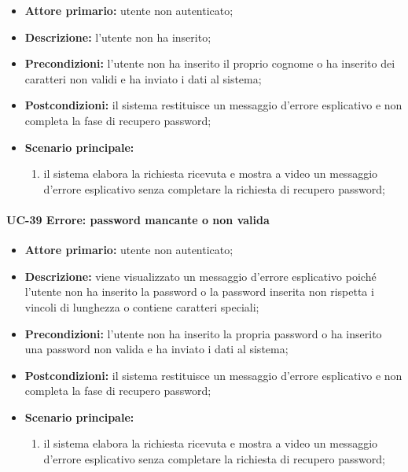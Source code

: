 	\begin{itemize}
		\item \textbf{Attore primario:} utente non autenticato;

		\item \textbf{Descrizione:} l'utente non ha inserito;

		\item \textbf{Precondizioni:} l'utente non ha inserito il proprio cognome o ha inserito dei caratteri non validi e ha inviato i dati al sistema;

		\item \textbf{Postcondizioni:} il sistema restituisce un messaggio d'errore esplicativo e non completa la fase di recupero password;

		\item \textbf{Scenario principale:}
	  		\begin{enumerate}
		  		\item il sistema elabora la richiesta ricevuta e mostra a video un messaggio d'errore esplicativo senza completare la richiesta di recupero password; 
	  		\end{enumerate}
	\end{itemize}

\paragraph{UC-39 Errore: password mancante o non valida}

	\begin{itemize}
		\item \textbf{Attore primario:} utente non autenticato;

		\item \textbf{Descrizione:} viene visualizzato un messaggio d'errore esplicativo poiché l'utente non ha inserito la password o la password inserita non rispetta i vincoli di lunghezza o contiene caratteri speciali;

		\item \textbf{Precondizioni:} l'utente non ha inserito la propria password o ha inserito una password non valida e ha inviato i dati al sistema;

		\item \textbf{Postcondizioni:} il sistema restituisce un messaggio d'errore esplicativo e non completa la fase di recupero password;

		\item \textbf{Scenario principale:}
	  		\begin{enumerate}
		  		\item il sistema elabora la richiesta ricevuta e mostra a video un messaggio d'errore esplicativo senza completare la richiesta di recupero password; 
	  		\end{enumerate}
	\end{itemize}

